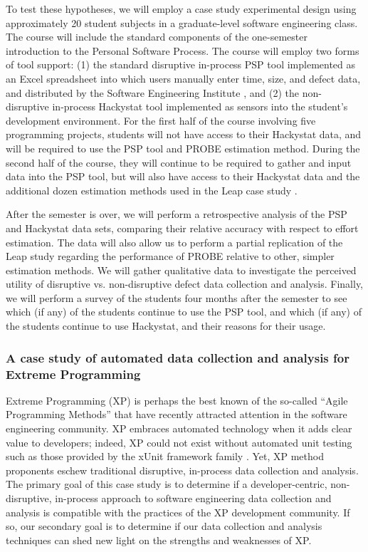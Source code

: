To test these hypotheses, we will employ a case study experimental
design using approximately 20 student subjects in a graduate-level
software engineering class.  The course will include the standard
components of the one-semester introduction to the Personal Software
Process.  The course will employ two forms of tool support: (1) the
standard disruptive in-process PSP tool implemented as an Excel spreadsheet
into which users manually enter time, size, and defect data, and
distributed by the Software Engineering Institute \cite{SeiPSPtool}, and
(2) the non-disruptive in-process Hackystat tool implemented as sensors
into the student's development environment. For the first half of the
course involving five programming projects, students will not have access
to their Hackystat data, and will be required to use the PSP tool and PROBE
estimation method.  During the second half of the course, they will
continue to be required to gather and input data into the PSP tool, but
will also have access to their Hackystat data and the additional dozen
estimation methods used in the Leap case study \cite{csdl2-00-03}.  

After the semester is over, we will perform a retrospective analysis
of the PSP and Hackystat data sets, comparing their relative accuracy with
respect to effort estimation. The data will also allow us to perform a
partial replication of the Leap study regarding the performance of PROBE
relative to other, simpler estimation methods.  We will gather qualitative
data to investigate the perceived utility of disruptive vs. non-disruptive
defect data collection and analysis.  Finally, we will perform a survey of
the students four months after the semester to see which (if any) of the
students continue to use the PSP tool, and which (if any) of the
students continue to use Hackystat, and their reasons for their
usage.

\subsubsection{A case study of automated data collection and analysis for 
Extreme Programming}

Extreme Programming (XP) is perhaps the best known of the so-called ``Agile
Programming Methods'' that have recently attracted attention in the
software engineering community.  
XP embraces automated technology when it
adds clear value to developers; indeed, XP could not exist without
automated unit testing such as those provided by the xUnit framework family
\cite{xUnit}. Yet, XP method proponents eschew traditional disruptive,
in-process data collection and analysis.  
The primary goal of this case
study is to determine if a developer-centric, non-disruptive,
in-process approach to software engineering data collection and analysis is
compatible with the practices of the XP development community. If
so, our secondary goal is to determine if our data collection and analysis
techniques can shed new light on the strengths and weaknesses of XP.

